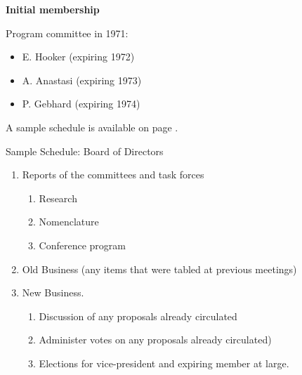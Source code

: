 \begin{refsection}
\textbf{Initial membership}

Program committee in 1971:

\begin{itemize}
\item E. Hooker (expiring 1972)

\item A. Anastasi (expiring 1973)

\item P. Gebhard (expiring 1974)

\end{itemize}

A sample schedule is available on page \pageref{sample:bod}.

\begin{apatextbox}{Sample Schedule: Board of Directors}


\begin{enumerate}

\item Reports of the committees and task forces \newline
\begin{enumerate}
\item  Research \newline
\item  Nomenclature \newline
\item  Conference program \newline
\end{enumerate}
\item Old Business (any items that were tabled at previous meetings) \newline
\item  New Business. \newline
\begin{enumerate}
    \item  Discussion of any proposals already circulated \newline
    \item  Administer votes on any proposals already circulated) \newline
    \item  Elections for vice-president and expiring member at large. \newline
\end{enumerate}
\end{enumerate}

\label{sample:bod}
\end{apatextbox}


\end{refsection}
